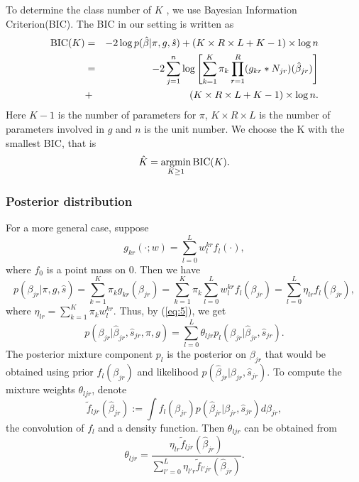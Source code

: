 \documentclass[11pt]{article}
\DeclareMathOperator*{\argmin}{argmin}
\begin{document}
To determine the class number of $K$ , we use Bayesian Information Criterion(BIC). The BIC in our setting is written as 
\begin{eqnarray}
{\rm BIC}(K) &=& -2\log p(\hat\beta|\pi,g,\hat s) + (K\times R\times L+K-1)\times \log n \nonumber \\
&=& -2 \sum_{j=1}^n\log\left[\sum_{k=1}^K\pi_k\prod_{r=1}^R(g_{kr}*N_{jr})(\hat\beta_{jr})\right] \nonumber\\
&+& (K\times R\times L+K-1)\times \log n.
\end{eqnarray}
Here $K-1$ is the number of parameters for $\pi$, $K\times R\times L$ is the number of parameters involved in $g$ and $n$ is the unit number. We choose the K with the smallest BIC, that is 
\begin{equation}
\hat K = \argmin_{K\geq1} {\rm BIC}(K).
\end{equation}

\subsubsection{Posterior distribution}

For a more general case, suppose
\begin{equation}
g_{kr}(\cdot;w) = \sum_{l=0}^L w_l^{kr}f_l(\cdot),
\label{eq:geng}
\end{equation}
where $f_0$ is a point mass on 0. Then we have 
\begin{equation}
    p(\beta_{jr}|\pi,g,\hat s) = \sum_{k=1}^K\pi_k g_{kr}(\beta_{jr})=  \sum_{k=1}^K\pi_k\sum_{l=0}^Lw_l^{kr}f_l(\beta_{jr})
    = \sum_{l=0}^L\eta_{lr}f_l(\beta_{jr}),
\end{equation}
where $\eta_{lr}=\sum_{k=1}^K\pi_kw_l^{kr}$. Thus, by (\ref{eq:5}), we get
\begin{equation}
    p(\beta_{jr}|\hat\beta_{jr},\hat s_{jr},\pi, g) = \sum_{l=0}^L\theta_{ljr}p_{l}(\beta_{jr}|\hat\beta_{jr},\hat s_{jr}).
\end{equation}
The posterior mixture component $p_l$ is the posterior on $\beta_{jr}$ that would be obtained using prior $f_l(\beta_{jr})$ and likelihood $p(\hat\beta_{jr}|\beta_{jr},\hat s_{jr})$. To compute the mixture weights $\theta_{ljr}$, denote
\begin{equation}
    \tilde f_{ljr}(\hat\beta_{jr}) := \int f_l(\beta_{jr})p(\hat\beta_{jr}|\beta_{jr},\hat s_{jr})d\beta_{jr},
\end{equation}
the convolution of $f_l$ and a density function. Then $\theta_{ljr}$ can be obtained from
\begin{equation}
    \theta_{ljr} = \frac{\eta_{lr}\tilde f_{ljr}(\hat\beta_{jr})}{\sum_{l'=0}^L\eta_{l'r}\tilde f_{l'jr}(\hat\beta_{jr})}.
\end{equation}
\end{document}
